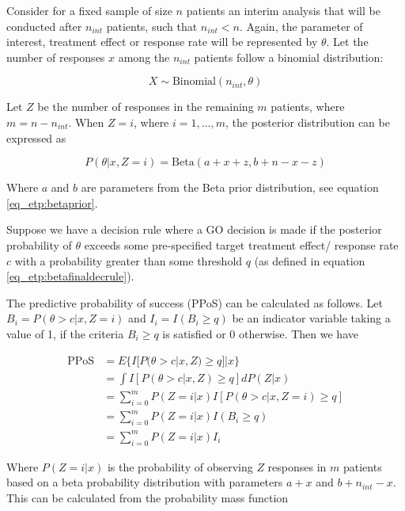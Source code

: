 Consider for a fixed sample of size $n$ patients an interim analysis that will be conducted after $n_{int}$ patients, such that $n_{int} < n$. Again, the parameter of interest, treatment effect or response rate will be represented by $\theta$. Let the number of responses $x$ among the $n_{int}$ patients follow a binomial distribution: 

\begin{equation}
	X \sim \text{Binomial}(n_{int},\theta) 
\end{equation}

Let $Z$ be the number of responses in the remaining $m$ patients, where $m = n - n_{int}$. When $Z = i$, where $i = 1, ..., m$, the posterior distribution can be expressed as 

\begin{equation}
	P(\theta|x,Z=i) = \text{Beta}(a+x+z, b+n-x-z)
\end{equation}

Where $a$ and $b$ are parameters from the Beta prior distribution, see equation \ref{eq_etp:betaprior}. 

Suppose we have a decision rule where a GO decision is made if the posterior probability of $\theta$ exceeds some pre-specified target treatment effect/ response rate $c$ with a probability greater than some threshold $q$ (as defined in equation \ref{eq_etp:betafinaldecrule}).

The predictive probability of success (PPoS) can be calculated as follows. Let $B_i = P(\theta > c |x, Z=i)$ and $I_i = I(B_i \geq q)$ be an indicator variable taking a value of 1, if the criteria $B_i \geq q$ is satisfied or 0 otherwise. Then we have 

\begin{equation}
	\begin{aligned}
		\text{PPoS} & = E\{I[P(\theta > c |x,Z) \geq q]|x \} \\
		& = \int I[P(\theta > c |x,Z) \geq q]dP(Z|x) \\
		& = \sum_{i =0}^{m} P(Z = i|x)I[P(\theta > c |x,Z=i) \geq q] \\
		& = \sum_{i =0}^{m} P(Z=i|x)I(B_i \geq q) \\
		& = \sum_{i =0}^{m} P(Z=i|x)I_i
	\end{aligned}
\end{equation}

Where $P(Z = i | x)$ is the probability of observing $Z$ responses in $m$ patients based on a beta probability distribution with parameters $a+x$ and $b+n_{int}-x$. This can be calculated from the probability mass function

